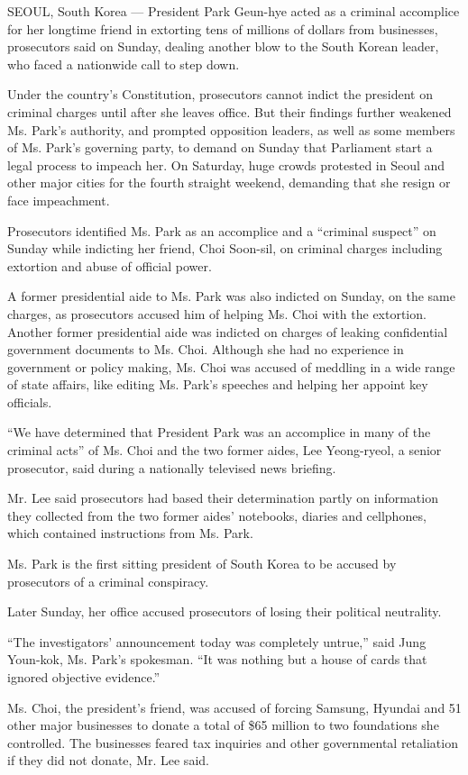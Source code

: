 SEOUL, South Korea --- President Park Geun-hye acted as a criminal
accomplice for her longtime friend in extorting tens of millions of
dollars from businesses, prosecutors said on Sunday, dealing another
blow to the South Korean leader, who faced a nationwide call to step
down.

Under the country's Constitution, prosecutors cannot indict the
president on criminal charges until after she leaves office. But their
findings further weakened Ms. Park's authority, and prompted opposition
leaders, as well as some members of Ms. Park's governing party, to
demand on Sunday that Parliament start a legal process to impeach her.
On Saturday, huge crowds protested in Seoul and other major cities for
the fourth straight weekend, demanding that she resign or face
impeachment.

Prosecutors identified Ms. Park as an accomplice and a ``criminal
suspect'' on Sunday while indicting her friend, Choi Soon-sil, on
criminal charges including extortion and abuse of official power.

A former presidential aide to Ms. Park was also indicted on Sunday, on
the same charges, as prosecutors accused him of helping Ms. Choi with
the extortion. Another former presidential aide was indicted on charges
of leaking confidential government documents to Ms. Choi. Although she
had no experience in government or policy making, Ms. Choi was accused
of meddling in a wide range of state affairs, like editing Ms. Park's
speeches and helping her appoint key officials.

``We have determined that President Park was an accomplice in many of
the criminal acts'' of Ms. Choi and the two former aides, Lee
Yeong-ryeol, a senior prosecutor, said during a nationally televised
news briefing.

Mr. Lee said prosecutors had based their determination partly on
information they collected from the two former aides' notebooks, diaries
and cellphones, which contained instructions from Ms. Park.

Ms. Park is the first sitting president of South Korea to be accused by
prosecutors of a criminal conspiracy.

Later Sunday, her office accused prosecutors of losing their political
neutrality.

``The investigators' announcement today was completely untrue,'' said
Jung Youn-kok, Ms. Park's spokesman. ``It was nothing but a house of
cards that ignored objective evidence.''

Ms. Choi, the president's friend, was accused of forcing Samsung,
Hyundai and 51 other major businesses to donate a total of \$65 million
to two foundations she controlled. The businesses feared tax inquiries
and other governmental retaliation if they did not donate, Mr. Lee said.


